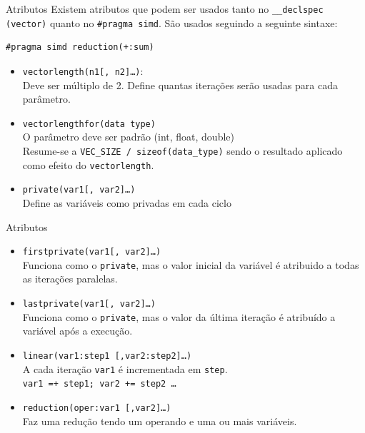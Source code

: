 \documentclass{beamer}
\begin{document}
\begin{frame}[fragile]{Atributos}
Existem atributos que podem ser usados tanto no \texttt{\_\_declspec (vector)}
quanto no \texttt{\#pragma simd}. São usados seguindo a seguinte sintaxe:

\begin{lstlisting}
#pragma simd reduction(+:sum)
\end{lstlisting}

\begin{itemize}
    \item \texttt{vectorlength(n1[, n2]\ldots)}: \\
        Deve ser múltiplo de 2. Define quantas iterações serão usadas para cada
        parâmetro.
	\item \texttt{vectorlengthfor(data type)} \\
		O parâmetro deve ser padrão (int, float, double) \\
        Resume-se a \texttt{VEC\_SIZE / sizeof(data\_type)} sendo o resultado
        aplicado como efeito do \texttt{vectorlength}.
	\item \texttt{private(var1[, var2]\ldots)} \\
		Define as variáveis como privadas em cada ciclo
\end{itemize}
\end{frame}

\begin{frame}[fragile]{Atributos}
\begin{itemize}
	\item \texttt{firstprivate(var1[, var2]\ldots)} \\
        Funciona como o \texttt{private}, mas o valor inicial da variável é
        atribuido a todas as iterações paralelas.
	\item \texttt{lastprivate(var1[, var2]\ldots)} \\
        Funciona como o \texttt{private}, mas o valor da última iteração é
        atribuído a variável após a execução.
	\item \texttt{linear(var1:step1 [,var2:step2]\ldots)} \\
		A cada iteração \texttt{var1} é incrementada em \texttt{step}. \\
		\texttt{var1 =+ step1; var2 += step2 \ldots}
	\item \texttt{reduction(oper:var1 [,var2]\ldots)} \\
		Faz uma redução tendo um operando e uma ou mais variáveis.
\end{itemize}
\end{frame}
\end{document}
